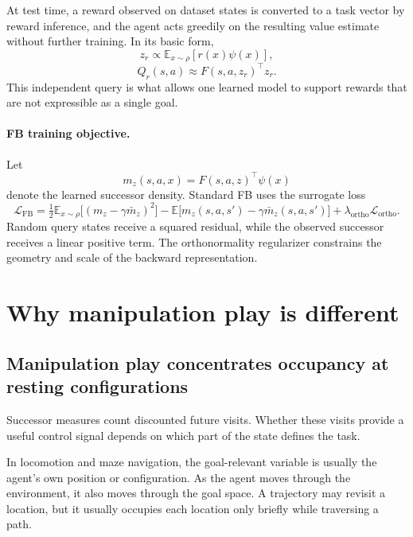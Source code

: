 \documentclass{article}
\newcommand{\E}{\mathbb{E}}
\begin{document}
At test time, a reward observed on dataset states is converted to a task vector by reward inference, and the agent acts greedily on the resulting value estimate without further training.
In its basic form,
\begin{equation}
\label{eq:fb-reward-inference}
z_r\propto\E_{x\sim\rho}[r(x)\psi(x)],
\end{equation}
\begin{equation}
Q_r(s,a)\approx F(s,a,z_r)^{\top}z_r.
\end{equation}
This independent query is what allows one learned model to support rewards that are not expressible as a single goal.

\paragraph{FB training objective.}
Let
\begin{equation}
m_z(s,a,x)=F(s,a,z)^{\top}\psi(x)
\end{equation}
denote the learned successor density.
Standard FB uses the surrogate loss \citep{touati2021learning}
\begin{equation}
\label{eq:fb-loss}
\mathcal{L}_{\mathrm{FB}}
=
\tfrac{1}{2}\E_{x\sim\rho}\big[(m_z-\gamma\bar m_z)^2\big]
-
\E\big[m_z(s,a,s')-\gamma\bar m_z(s,a,s')\big]
+
\lambda_{\mathrm{ortho}}\mathcal{L}_{\mathrm{ortho}}.
\end{equation}
Random query states receive a squared residual, while the observed successor receives a linear positive term.
The orthonormality regularizer constrains the geometry and scale of the backward representation.

\section{Why manipulation play is different}
\label{sec:play-structure}

\subsection{Manipulation play concentrates occupancy at resting configurations}
\label{sec:playdata}

Successor measures count discounted future visits.
Whether these visits provide a useful control signal depends on which part of the state defines the task.

In locomotion and maze navigation, the goal-relevant variable is usually the agent's own position or configuration.
As the agent moves through the environment, it also moves through the goal space.
A trajectory may revisit a location, but it usually occupies each location only briefly while traversing a path.
\end{document}
